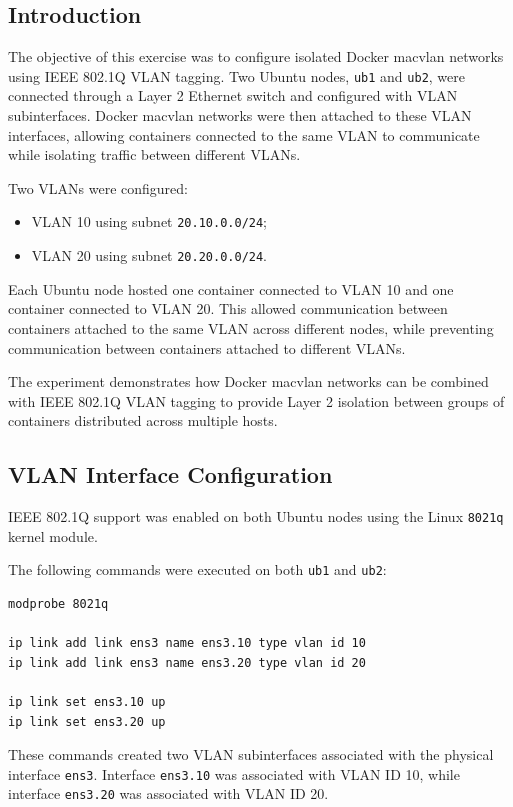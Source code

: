 \documentclass[12pt]{article}
\begin{document}
\subsection{Introduction}

The objective of this exercise was to configure isolated Docker macvlan networks using IEEE 802.1Q VLAN tagging. Two Ubuntu nodes, \texttt{ub1} and \texttt{ub2}, were connected through a Layer 2 Ethernet switch and configured with VLAN subinterfaces. Docker macvlan networks were then attached to these VLAN interfaces, allowing containers connected to the same VLAN to communicate while isolating traffic between different VLANs.

Two VLANs were configured:

\begin{itemize}
    \item VLAN 10 using subnet \texttt{20.10.0.0/24};
    \item VLAN 20 using subnet \texttt{20.20.0.0/24}.
\end{itemize}

Each Ubuntu node hosted one container connected to VLAN 10 and one container connected to VLAN 20. This allowed communication between containers attached to the same VLAN across different nodes, while preventing communication between containers attached to different VLANs.

The experiment demonstrates how Docker macvlan networks can be combined with IEEE 802.1Q VLAN tagging to provide Layer 2 isolation between groups of containers distributed across multiple hosts.

\subsection{VLAN Interface Configuration}

IEEE 802.1Q support was enabled on both Ubuntu nodes using the Linux \texttt{8021q} kernel module.

The following commands were executed on both \texttt{ub1} and \texttt{ub2}:

\begin{verbatim}
modprobe 8021q

ip link add link ens3 name ens3.10 type vlan id 10
ip link add link ens3 name ens3.20 type vlan id 20

ip link set ens3.10 up
ip link set ens3.20 up
\end{verbatim}

These commands created two VLAN subinterfaces associated with the physical interface \texttt{ens3}. Interface \texttt{ens3.10} was associated with VLAN ID 10, while interface \texttt{ens3.20} was associated with VLAN ID 20.
\end{document}
